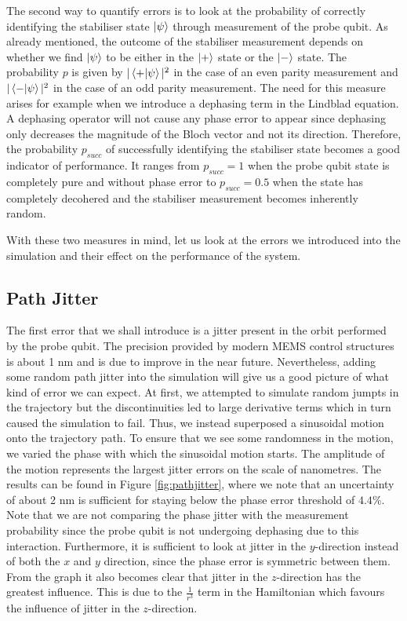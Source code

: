 The second way to quantify errors is to look at the probability of correctly identifying the stabiliser state  $\ket{\psi}$ through measurement of the probe qubit. As already mentioned, the outcome of the stabiliser measurement depends on whether we find $\ket{\psi}$ to be either in the $\ket{+}$ state or the $\ket{-}$ state. The probability $p$ is given by $|\left\langle +|\psi \right\rangle|^2$ in the case of an even parity measurement and $|\left\langle - |\psi \right\rangle|^2$ in the case of an odd parity measurement. The need for this measure arises for example when we introduce a dephasing term in the Lindblad equation. A dephasing operator will not cause any phase error to appear since dephasing only decreases the magnitude of the Bloch vector and not its direction. Therefore, the probability $p_{succ}$ of successfully identifying the stabiliser state becomes a good indicator of performance. It ranges from $p_{succ} = 1$ when the probe qubit state is completely pure and without phase error to $p_{succ} = 0.5$ when the state has completely decohered and the stabiliser measurement becomes inherently random. 

With these two measures in mind, let us look at the errors we introduced into the simulation and their effect on the performance of the system. 




\subsection{Path Jitter}\label{sec:jitter}
The first error that we shall introduce is a jitter present in the orbit performed by the probe qubit. The precision provided by modern MEMS control structures is about 1 nm \cite{MEMS precision} and is due to improve in the near future. Nevertheless, adding some random path jitter into the simulation will give us a good picture of what kind of error we can expect. At first, we attempted to simulate random jumpts in the trajectory but the discontinuities led to large derivative terms which in turn caused the simulation to fail. Thus,  we instead superposed a sinusoidal motion onto the trajectory path. To ensure that we see some randomness in the motion, we varied the phase with which the sinusoidal motion starts. The amplitude of the motion represents the largest jitter errors on the scale of nanometres. The results can be found in Figure \ref{fig:pathjitter}, where we note that an uncertainty of about 2 nm is sufficient for staying below the phase error threshold of $4.4 \%$. Note that we are not comparing the phase jitter with the measurement probability since the probe qubit is not undergoing dephasing due to this interaction. Furthermore, it is sufficient to look at jitter in the $y$-direction instead of both the $x$ and $y$ direction, since the phase error is symmetric between them. 
From the graph it also becomes clear that jitter in the $z$-direction has the greatest influence. This is due to the $\frac{1}{r^3}$  term in the Hamiltonian which favours the influence of jitter in the $z$-direction. 



